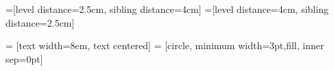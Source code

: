 \documentclass{article}
\begin{document}
=[level distance=2.5cm, sibling distance=4cm]
=[level distance=4cm, sibling distance=2.5cm]

 = [text width=8em, text centered]
 = [circle, minimum width=3pt,fill, inner sep=0pt]

\end{document}

